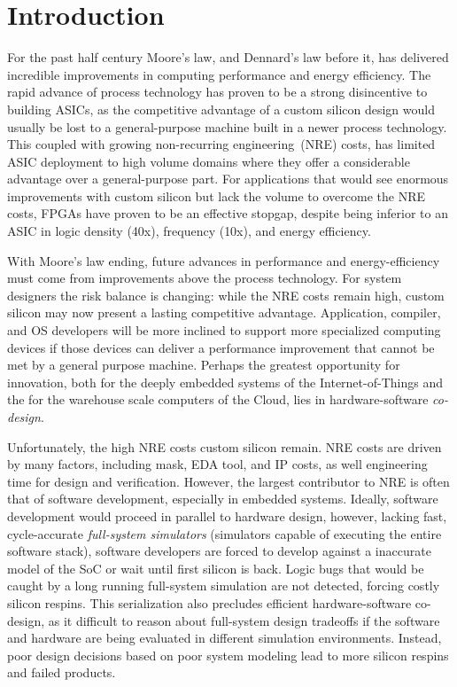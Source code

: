 \chapter{Introduction}

For the past half century Moore's law, and Dennard's law before it, has
delivered incredible improvements in computing performance and energy
efficiency. The rapid advance of process technology has proven to be a strong
disincentive to building ASICs, as the competitive advantage of a custom
silicon design would usually be lost to a general-purpose machine built in a
newer process technology. This coupled with growing non-recurring
engineering~(NRE) costs, has limited ASIC deployment to high volume domains
where they offer a considerable advantage over a general-purpose part. For
applications that would see enormous improvements with custom silicon but lack
the volume to overcome the NRE costs, FPGAs have proven to be an effective
stopgap, despite being inferior to an ASIC in logic density (40x), frequency
(10x), and energy efficiency.

With Moore’s law ending, future advances in performance and energy-efficiency
must come from improvements above the process technology. For system designers
the risk balance is changing: while the NRE costs remain high, custom silicon
may now present a lasting competitive advantage. Application, compiler, and OS
developers will be more inclined to support more specialized computing devices
if those devices can deliver a performance improvement that cannot be met by a
general purpose machine. Perhaps the greatest opportunity for innovation, both for the
deeply embedded systems of the Internet-of-Things and the for the warehouse
scale computers of the Cloud, lies in hardware-software \emph{co-design}.

Unfortunately, the high NRE costs custom silicon remain. NRE costs are driven
by many factors, including mask, EDA tool, and IP costs, as well engineering
time for design and verification. However, the largest contributor to NRE is
often that of software development, especially in embedded systems. Ideally,
software development would proceed in parallel to hardware design, however,
lacking fast, cycle-accurate \emph{full-system simulators} (simulators capable
of executing the entire software stack), software developers are forced to
develop against a inaccurate model of the SoC or wait until first silicon is
back. Logic bugs that would be caught by a long running full-system simulation
are not detected, forcing costly silicon respins. This serialization
also precludes efficient hardware-software co-design, as it difficult to reason
about full-system design tradeoffs if the software and hardware are being
evaluated in different simulation environments. Instead, poor design decisions
based on poor system modeling lead to more silicon respins and failed products.

